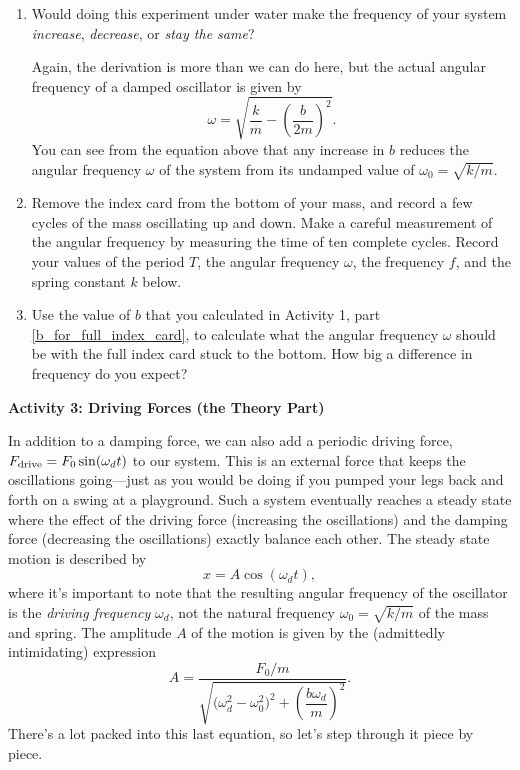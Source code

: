 \begin{enumerate}[labparts]

\item Would doing this experiment under water make the frequency of your system \textit{increase}, \textit{decrease}, or \textit{stay the same}?  
\answerspace{0.6in}

Again, the derivation is more than we can do here, but the actual angular frequency of a damped oscillator is given by
\begin{equation}
\omega =\sqrt{\frac{k}{m} - \left( \frac{b}{2m}\right)^2}.
\label{equation_damped_frequency}
\end{equation}
You can see from the equation above that any increase in $b$ reduces the angular frequency $\omega$ of the system from its undamped value of $\omega_0=\sqrt{k/m}$.  

\item Remove the index card from the bottom of your mass, and record a few cycles of the mass oscillating up and down.  Make a careful measurement of the angular frequency by measuring the time of ten complete cycles.  Record your values of the period $T$, the angular frequency $\omega$, the frequency $f$, and the spring constant $k$ below.
\answerspace{1.2in}

\item Use the value of $b$ that you calculated in Activity 1, part \ref{b_for_full_index_card}, to calculate what the angular frequency $\omega$ should be with the full index card stuck to the bottom.  How big a difference in frequency do you expect? 
\answerspace{0.6in}
 
\end{enumerate}

\textbf{Activity 3: Driving Forces (the Theory Part)}

In addition to a damping force, we can also add a periodic driving force, $F_{\rm drive}=F_0 \sin(\omega_d t)$ to our system.  This is an external force that keeps the oscillations going---just as you would be doing if you pumped your legs back and forth on a swing at a playground.  Such a system eventually reaches a steady state where the effect of the driving force (increasing the oscillations) and the damping force (decreasing the oscillations) exactly balance each other.  The steady state motion is described by
\begin{equation}
x = A \cos(\omega_d t),
\end{equation}
where it's important to note that the resulting angular frequency of the oscillator is the \textit{driving frequency} 
$\omega_d$, not the natural frequency $\omega_0=\sqrt{k/m}$ of the mass and spring.  
The amplitude $A$ of the motion is given by the (admittedly intimidating) expression
\begin{equation}
A = \frac{F_0/m}{\sqrt{\bigg( \omega_d^2 - \omega_0^2 \bigg)^2 + \left( \dfrac{b\omega_d}{m} \right)^2}}.
\end{equation}
There's a lot packed into this last equation, so let's step through it piece by piece.

